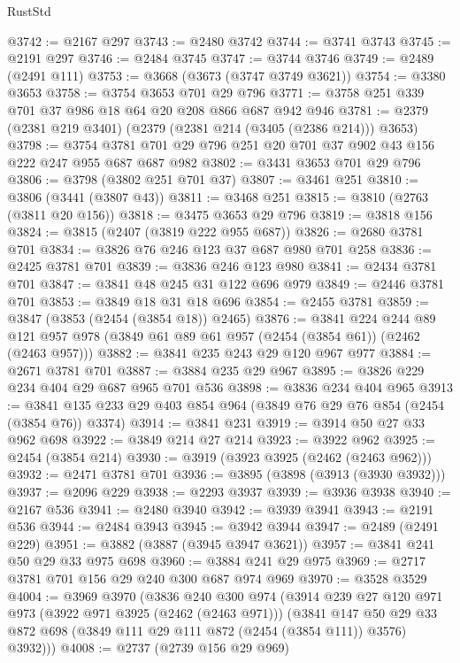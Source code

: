 \begin{lexlean}{RustStd}
\begin{coremodule}
@3742 := @2167 @297
@3743 := @2480 @3742
@3744 := @3741 @3743
@3745 := @2191 @297
@3746 := @2484 @3745
@3747 := @3744 @3746
@3749 := @2489 (@2491 @111)
@3753 := @3668 (@3673 (@3747 @3749 @3621))
@3754 := @3380 @3653
@3758 := @3754 @3653 @701 @29 @796
@3771 := @3758 @251 @339 @701 @37 @986 @18 @64 @20 @208 @866 @687 @942 @946
@3781 := @2379 (@2381 @219 @3401) (@2379 (@2381 @214 (@3405 (@2386 @214))) @3653)
@3798 := @3754 @3781 @701 @29 @796 @251 @20 @701 @37 @902 @43 @156 @222 @247 @955 @687 @687 @982
@3802 := @3431 @3653 @701 @29 @796
@3806 := @3798 (@3802 @251 @701 @37)
@3807 := @3461 @251
@3810 := @3806 (@3441 (@3807 @43))
@3811 := @3468 @251
@3815 := @3810 (@2763 (@3811 @20 @156))
@3818 := @3475 @3653 @29 @796
@3819 := @3818 @156
@3824 := @3815 (@2407 (@3819 @222 @955 @687))
@3826 := @2680 @3781 @701
@3834 := @3826 @76 @246 @123 @37 @687 @980 @701 @258
@3836 := @2425 @3781 @701
@3839 := @3836 @246 @123 @980
@3841 := @2434 @3781 @701
@3847 := @3841 @48 @245 @31 @122 @696 @979
@3849 := @2446 @3781 @701
@3853 := @3849 @18 @31 @18 @696
@3854 := @2455 @3781
@3859 := @3847 (@3853 (@2454 (@3854 @18)) @2465)
@3876 := @3841
    @224
    @244
    @89
    @121
    @957
    @978
    (@3849 @61 @89 @61 @957 (@2454 (@3854 @61)) (@2462 (@2463 @957)))
@3882 := @3841 @235 @243 @29 @120 @967 @977
@3884 := @2671 @3781 @701
@3887 := @3884 @235 @29 @967
@3895 := @3826 @229 @234 @404 @29 @687 @965 @701 @536
@3898 := @3836 @234 @404 @965
@3913 := @3841 @135 @233 @29 @403 @854 @964 (@3849 @76 @29 @76 @854 (@2454 (@3854 @76)) @3374)
@3914 := @3841 @231
@3919 := @3914 @50 @27 @33 @962 @698
@3922 := @3849 @214 @27 @214
@3923 := @3922 @962
@3925 := @2454 (@3854 @214)
@3930 := @3919 (@3923 @3925 (@2462 (@2463 @962)))
@3932 := @2471 @3781 @701
@3936 := @3895 (@3898 (@3913 (@3930 @3932)))
@3937 := @2096 @229
@3938 := @2293 @3937
@3939 := @3936 @3938
@3940 := @2167 @536
@3941 := @2480 @3940
@3942 := @3939 @3941
@3943 := @2191 @536
@3944 := @2484 @3943
@3945 := @3942 @3944
@3947 := @2489 (@2491 @229)
@3951 := @3882 (@3887 (@3945 @3947 @3621))
@3957 := @3841 @241 @50 @29 @33 @975 @698
@3960 := @3884 @241 @29 @975
@3969 := @2717 @3781 @701 @156 @29 @240 @300 @687 @974 @969
@3970 := @3528 @3529
@4004 := @3969
    @3970
    (@3836
      @240
      @300
      @974
      (@3914
        @239
        @27
        @120
        @971
        @973
        (@3922 @971 @3925 (@2462 (@2463 @971)))
        (@3841
          @147
          @50
          @29
          @33
          @872
          @698
          (@3849 @111 @29 @111 @872 (@2454 (@3854 @111)) @3576)
          @3932)))
@4008 := @2737 (@2739 @156 @29 @969)

\end{coremodule}
\end{lexlean}
